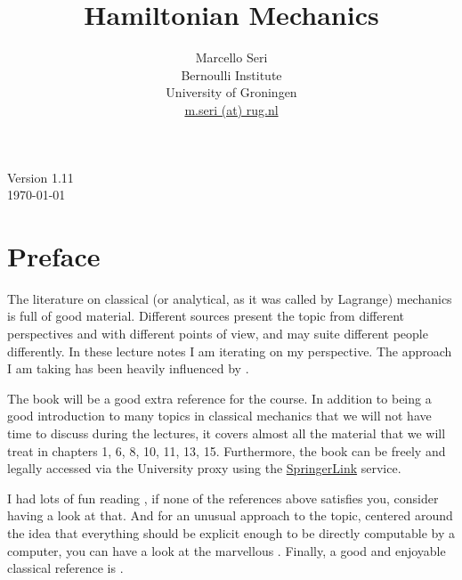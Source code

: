 \documentclass[english,fontsize=11pt,paper=b5]{scrbook}
\title{Hamiltonian Mechanics}
\author{Marcello Seri\\
  \small{Bernoulli Institute}\vspace{-.2cm}\\
  \small{University of Groningen}\vspace{-.2cm}\\
  \small\href{mailto:m.seri@rug.nl}{m.seri (at) rug.nl}
}
\date{}
\def\biblio{}
\theoremstyle{definition}
\begin{document}
\def\biblio{}

\maketitle

\cleardoublepage

\thispagestyle{empty}
\null\vfill
\begin{center}
  Version 1.11\\
  \today
\end{center}
\begin{warpprint}
  \vfill
  \small{\doclicenseThis}
\end{warpprint}
\cleardoublepage

\tableofcontents

\cleardoublepage

\chapter*{Preface}

The literature on classical (or analytical, as it was called by Lagrange) mechanics is full of good material.
Different sources present the topic from different perspectives and with different points of view, and may suite different people differently.
In these lecture notes I am iterating on my perspective.
The approach I am taking has been heavily influenced by \cite{book:arnold, book:knauf, lectures:dubrovin, book:lowenstein, book:marsdenratiu, lectures:tong, landau1976mechanics}.

The book \cite{book:knauf} will be a good extra reference for the course. In addition to being a good introduction to many topics in classical mechanics that we will not have time to discuss during the lectures, it covers almost all the material that we will treat in chapters 1, 6, 8, 10, 11, 13, 15. Furthermore, the book can be freely and legally accessed via the University proxy using the \href{https://link.springer.com/book/10.1007%2F978-3-662-55774-7}{SpringerLink} service.

  I had lots of fun reading \cite{schwichtenberg2019no}, if none of the references above satisfies you, consider having a look at that. And for an unusual approach to the topic, centered around the idea that everything should be explicit enough to be directly computable by a computer, you can have a look at the marvellous \cite{book:sicm}. Finally, a good and enjoyable classical reference is \cite{goldstein2013classical}.\medskip
\end{document}
